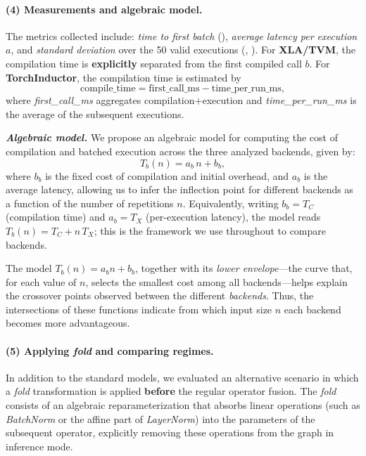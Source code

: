 \documentclass[sigconf,anonymous]{acmart}
\newcommand{\tcode}[1]{\texttt{\seqsplit{#1}}}
\begin{document}
\paragraph{(4) Measurements and algebraic model.}
The metrics collected include: \textit{time to first batch} (\tcode{ttfb\_ms}), \textit{average latency per execution} $a$, and \textit{standard deviation} over the 50 valid executions (\tcode{exec\_ms\_mean}, \tcode{exec\_ms\_std}). For \textbf{XLA/TVM}, the compilation time is \textbf{explicitly} separated from the first compiled call $b$. For \textbf{TorchInductor}, the compilation time is estimated by
\[
\mathrm{compile\_time}=\mathrm{first\_call\_ms}-\mathrm{time\_per\_run\_ms},
\]
where \textit{first\_call\_ms} aggregates compilation+execution and \textit{time\_per\_run\_ms} is the average of the subsequent executions.

\textbf{\textit{Algebraic model.}}
We propose an algebraic model for computing the cost of compilation and batched execution across the three analyzed backends, given by:
\[
T_b(n) = a_b\,n + b_b,
\]
where $b_b$ is the fixed cost of compilation and initial overhead, and $a_b$ is the average latency, allowing us to infer the inflection point for different backends as a function of the number of repetitions $n$. Equivalently, writing $b_b = T_C$ (compilation time) and $a_b = T_X$ (per-execution latency), the model reads $T_b(n) = T_C + n\,T_X$; this is the framework we use throughout to compare backends.

The model \(T_b(n) = a_b n + b_b\), together with its \emph{lower envelope}---the curve that, for each value of \(n\), selects the smallest cost among all backends---helps explain the crossover points observed between the different \emph{backends}. Thus, the intersections of these functions indicate from which input size \(n\) each backend becomes more advantageous.

\paragraph{(5) Applying \textit{fold} and comparing regimes.}
In addition to the standard models, we evaluated an alternative scenario in which a \textit{fold} transformation is applied \textbf{before} the regular operator fusion. The \textit{fold} consists of an algebraic reparameterization that absorbs linear operations (such as \textit{BatchNorm} or the affine part of \textit{LayerNorm}) into the parameters of the subsequent operator, explicitly removing these operations from the graph in inference mode.
\end{document}
